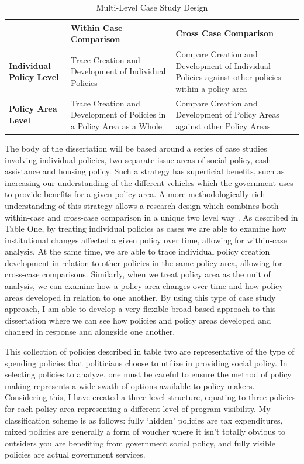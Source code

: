 \documentclass[12pt]{article}
\begin{document}

\begin{table}
\centering
    \begin{tabularx}{\textwidth}{XXX} \toprule
           & \textbf{Within Case Comparison} & \textbf{Cross Case Comparison                                                                              } \\ \midrule
    \textbf{Individual Policy Level} & Trace Creation and Development of Individual Policies        & Compare Creation and Development of Individual Policies against other policies within a policy area \\
    \textbf{Policy Area Level}       & Trace Creation and Development of Policies in a Policy Area as a Whole & Compare Creation and Development of Policy Areas against other Policy Areas                         \\ \bottomrule
    \end{tabularx}
  \caption{Multi-Level Case Study Design}
  \label{tab:casestudy}
\end{table}

The body of the dissertation will be based around a series of case studies involving individual policies, two separate issue areas of social policy, cash assistance and housing policy. Such a strategy has superficial benefits, such as increasing our understanding of the different vehicles which the government uses to provide benefits for a given policy area. A more methodologically rich understanding of this strategy allows a research design which combines both within-case and cross-case comparison in a unique two level way \citep{george2005, goertz2012}. As described in Table One, by treating individual policies as cases we are able to examine how institutional changes affected a given policy over time, allowing for within-case analysis. At the same time, we are able to trace individual policy creation development in relation to other policies in the same policy area, allowing for cross-case comparisons. Similarly, when we treat policy area as the unit of analysis, we can examine how a policy area changes over time and how policy areas developed in relation to one another. By using this type of case study approach, I am able to develop a very flexible broad based approach to this dissertation where we can see how policies and policy areas developed and changed in response and alongside one another. 

This collection of policies described in table two are representative of the type of spending policies that politicians choose to utilize in providing social policy. In selecting policies to analyze, one must be careful to ensure the method of policy making represents a wide swath of options available to policy makers. Considering this, I have created a three level structure, equating to three policies for each policy area representing a different level of program visibility. My classification scheme is as follows: fully `hidden' policies are tax expenditures, mixed policies are generally a form of voucher where it isn't totally obvious to outsiders you are benefiting from government social policy, and fully visible policies are actual government services. 
\end{document}
